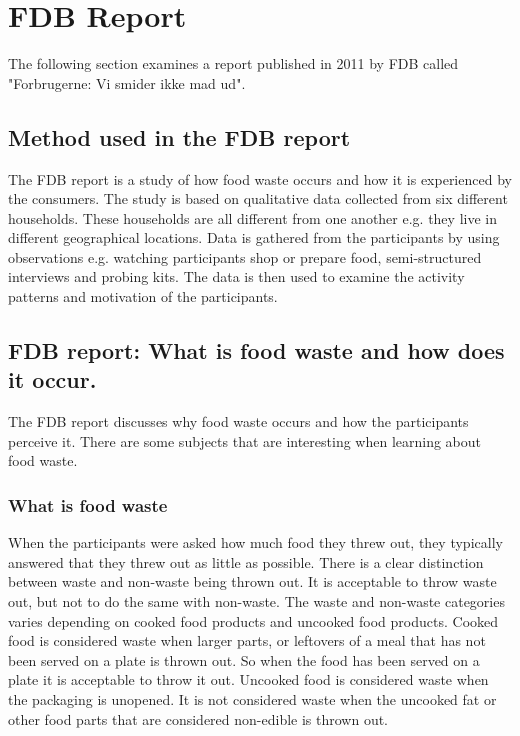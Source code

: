 \section{FDB Report}
The following section examines a report published in 2011 by FDB called "Forbrugerne: Vi smider ikke mad ud"\cite{madSpild_FDB}.
\subsection{Method used in the FDB report}
The FDB report is a study of how food waste occurs and how it is experienced by the consumers. The study is based on qualitative data collected from six different households. These households are all different from one another e.g. they live in different geographical locations. Data is gathered from the participants by using observations e.g. watching participants shop or prepare food, semi-structured interviews and probing kits. The data is then used to examine the activity patterns and motivation of the participants.

\subsection{FDB report: What is food waste and how does it occur.}
The FDB report discusses why food waste occurs and how the participants perceive it. There are some subjects that are interesting when learning about food waste. 

\subsubsection{What is food waste}
When the participants were asked how much food they threw out, they typically answered that they threw out as little as possible. There is a clear distinction between waste and non-waste being thrown out. It is acceptable to throw waste out, but not to do the same with non-waste. The waste and non-waste categories varies depending on cooked food products and uncooked food products. Cooked food is considered waste when larger parts, or leftovers of a meal that has not been served on a plate is thrown out. So when the food has been served on a plate it is acceptable to throw it out. Uncooked food is considered waste when the packaging is unopened. It is not considered waste when the uncooked fat or other food parts that are considered non-edible is thrown out.

